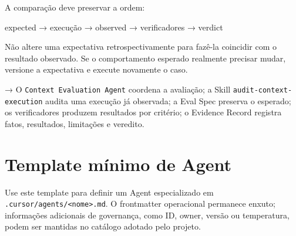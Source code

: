 \documentclass[
  10pt,
  a4paper,
  oneside]{book}
\newenvironment{Shaded}{}{}
\newcommand{\NormalTok}[1]{#1}
\renewenvironment{Shaded}{\begin{snugshade}}{\end{snugshade}}%
\begin{document}
A comparação deve preservar a ordem:

\begin{Shaded}
\begin{Highlighting}[]
\NormalTok{expected}
\NormalTok{→ execução}
\NormalTok{→ observed}
\NormalTok{→ verificadores}
\NormalTok{→ verdict}
\end{Highlighting}
\end{Shaded}

Não altere uma expectativa retrospectivamente para fazê-la coincidir com
o resultado observado. Se o comportamento esperado realmente precisar
mudar, versione a expectativa e execute novamente o caso.

→ O \texttt{Context\ Evaluation\ Agent} coordena a avaliação; a Skill
\texttt{audit-context-execution} audita uma execução já observada; a
Eval Spec preserva o esperado; os verificadores produzem resultados por
critério; o Evidence Record registra fatos, resultados, limitações e
veredito.

\hypertarget{template-muxednimo-de-agent}{%
\section{Template mínimo de Agent}\label{template-muxednimo-de-agent}}

Use este template para definir um Agent especializado em
\texttt{.cursor/agents/\textless{}nome\textgreater{}.md}. O frontmatter
operacional permanece enxuto; informações adicionais de governança, como
ID, owner, versão ou temperatura, podem ser mantidas no catálogo adotado
pelo projeto.
\end{document}

